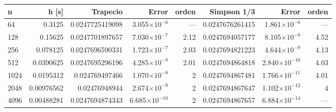 {\footnotesize
\begin{longtable}{lrrrrrrr}
\toprule
\textbf{n} & \textbf{h [s]} & \textbf{Trapecio} & \textbf{Error} & \textbf{orden} & \textbf{Simpson 1/3} & \textbf{Error} & \textbf{orden} \\
\midrule
\endhead
64 & 0.3125 & 0.0247725419098 & 3.055$\times10^{-6}$ & — & 0.0247676261415 & 1.861$\times10^{-6}$ & — \\
128 & 0.15625 & 0.0247701897657 & 7.030$\times10^{-7}$ & 2.12 & 0.0247694057177 & 8.105$\times10^{-8}$ & 4.52 \\
256 & 0.078125 & 0.0247696590331 & 1.723$\times10^{-7}$ & 2.03 & 0.0247694821223 & 4.644$\times10^{-9}$ & 4.13 \\
512 & 0.0390625 & 0.0247695296196 & 4.285$\times10^{-8}$ & 2.01 & 0.0247694864818 & 2.840$\times10^{-10}$ & 4.03 \\
1024 & 0.0195312 & 0.024769497466 & 1.070$\times10^{-8}$ & 2 & 0.0247694867481 & 1.766$\times10^{-11}$ & 4.01 \\
2048 & 0.00976562 & 0.02476948944 & 2.674$\times10^{-9}$ & 2 & 0.0247694867647 & 1.102$\times10^{-12}$ & 4 \\
4096 & 0.00488281 & 0.0247694874343 & 6.685$\times10^{-10}$ & 2 & 0.0247694867657 & 6.884$\times10^{-14}$ & — \\
\bottomrule
\end{longtable}
}
